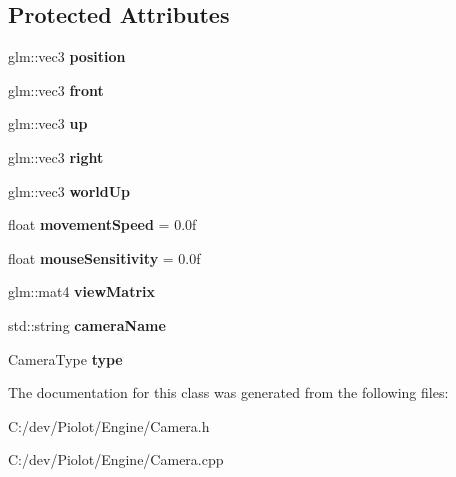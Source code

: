 \subsection*{Protected Attributes}
\begin{DoxyCompactItemize}
\item 
\mbox{\label{classpiolot_1_1_camera_a4552a5cf81a5a8ed249f632e157947a1}} 
glm\+::vec3 {\bfseries position}
\item 
\mbox{\label{classpiolot_1_1_camera_a2adfedf79a032c96798b7d6e01755b5a}} 
glm\+::vec3 {\bfseries front}
\item 
\mbox{\label{classpiolot_1_1_camera_a31ccd695a741d232fa4592d7713de37e}} 
glm\+::vec3 {\bfseries up}
\item 
\mbox{\label{classpiolot_1_1_camera_a20ee1dceb691bb4eefda7a792a6de7c5}} 
glm\+::vec3 {\bfseries right}
\item 
\mbox{\label{classpiolot_1_1_camera_ae722f7d01f68b23b82feb2adb74b90c2}} 
glm\+::vec3 {\bfseries world\+Up}
\item 
\mbox{\label{classpiolot_1_1_camera_a92aadc4b56ef9667081ecb52b2d7bc42}} 
float {\bfseries movement\+Speed} = 0.\+0f
\item 
\mbox{\label{classpiolot_1_1_camera_ade10b624b272d00a83fdc969da8755f9}} 
float {\bfseries mouse\+Sensitivity} = 0.\+0f
\item 
\mbox{\label{classpiolot_1_1_camera_a8f9352500ba36f03f6a384cc28579a95}} 
glm\+::mat4 {\bfseries view\+Matrix}
\item 
\mbox{\label{classpiolot_1_1_camera_acada09a9b00303c10c694c386fa05f87}} 
std\+::string {\bfseries camera\+Name}
\item 
\mbox{\label{classpiolot_1_1_camera_a782c913d63204fd8e22c17111dc1921f}} 
Camera\+Type {\bfseries type}
\end{DoxyCompactItemize}


The documentation for this class was generated from the following files\+:\begin{DoxyCompactItemize}
\item 
C\+:/dev/\+Piolot/\+Engine/Camera.\+h\item 
C\+:/dev/\+Piolot/\+Engine/Camera.\+cpp\end{DoxyCompactItemize}
